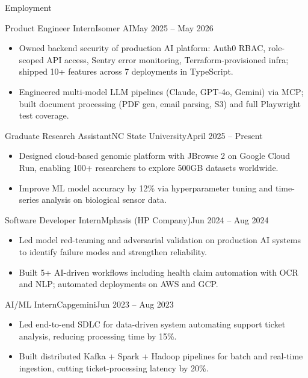 \documentclass[]{mcdowellcv}
\begin{document}
\makeheader

\begin{cvsection}{Employment}
  \begin{cvsubsection}{Product Engineer Intern}{Isomer AI}{May 2025 -- May 2026}
    \begin{itemize}
      \item Owned backend security of production AI platform: Auth0 RBAC, role-scoped API access, Sentry error monitoring, Terraform-provisioned infra; shipped 10+ features across 7 deployments in TypeScript.
      \item Engineered multi-model LLM pipelines (Claude, GPT-4o, Gemini) via MCP; built document processing (PDF gen, email parsing, S3) and full Playwright test coverage.
    \end{itemize}
    \vspace{-1.5pt}
  \end{cvsubsection}

  \begin{cvsubsection}{Graduate Research Assistant}{NC State University}{April 2025 -- Present}
    \begin{itemize}
      \item Designed cloud-based genomic platform with JBrowse 2 on Google Cloud Run, enabling 100+ researchers to explore 500GB datasets worldwide.
      \item Improve ML model accuracy by 12\% via hyperparameter tuning and time-series analysis on biological sensor data.
    \end{itemize}
    \vspace{-1.5pt}
  \end{cvsubsection}

  \begin{cvsubsection}{Software Developer Intern}{Mphasis (HP Company)}{Jun 2024 -- Aug 2024}
    \begin{itemize}
      \item Led model red-teaming and adversarial validation on production AI systems to identify failure modes and strengthen reliability.
      \item Built 5+ AI-driven workflows including health claim automation with OCR and NLP; automated deployments on AWS and GCP.
    \end{itemize}
    \vspace{-1.5pt}
  \end{cvsubsection}

  \begin{cvsubsection}{AI/ML Intern}{Capgemini}{Jun 2023 -- Aug 2023}
    \begin{itemize}
      \item Led end-to-end SDLC for data-driven system automating support ticket analysis, reducing processing time by 15\%.
      \item Built distributed Kafka + Spark + Hadoop pipelines for batch and real-time ingestion, cutting ticket-processing latency by 20\%.
    \end{itemize}
    \vspace{-1.5pt}
  \end{cvsubsection}
\end{cvsection}
\end{document}
